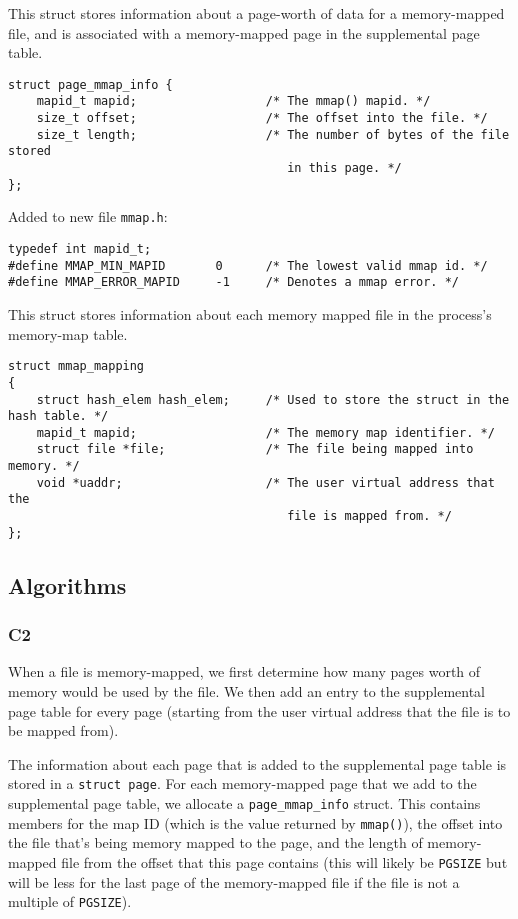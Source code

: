 \documentclass[a4wide, 11pt]{article}
\newcommand{\tx}{\texttt}
\begin{document}
This struct stores information about a page-worth of data for a memory-mapped file, and is associated with a memory-mapped page in the supplemental page table.
\begin{verbatim}
struct page_mmap_info {
    mapid_t mapid;                  /* The mmap() mapid. */
    size_t offset;                  /* The offset into the file. */
    size_t length;                  /* The number of bytes of the file stored
                                       in this page. */
};
\end{verbatim}

Added to new file \tx{mmap.h}:
\begin{verbatim}
typedef int mapid_t;
#define MMAP_MIN_MAPID       0      /* The lowest valid mmap id. */
#define MMAP_ERROR_MAPID     -1     /* Denotes a mmap error. */
\end{verbatim}

This struct stores information about each memory mapped file in the process's memory-map table.
\begin{verbatim}
struct mmap_mapping
{
    struct hash_elem hash_elem;     /* Used to store the struct in the hash table. */
    mapid_t mapid;                  /* The memory map identifier. */
    struct file *file;              /* The file being mapped into memory. */
    void *uaddr;                    /* The user virtual address that the
                                       file is mapped from. */
};
\end{verbatim}

\subsection{Algorithms}
\subsubsection{C2}

When a file is memory-mapped, we first determine how many pages worth of memory would be used by the file. We then add an entry to the supplemental page table for every page (starting from the user virtual address that the file is to be mapped from).

The information about each page that is added to the supplemental page table is stored in a \tx{struct page}. For each memory-mapped page that we add to the supplemental page table, we allocate a \tx{page\_mmap\_info} struct. This contains members for the map ID (which is the value returned by \tx{mmap()}), the offset into the file that's being memory mapped to the page, and the length of memory-mapped file from the offset that this page contains (this will likely be \tx{PGSIZE} but will be less for the last page of the memory-mapped file if the file is not a multiple of \tx{PGSIZE}).
\end{document}
